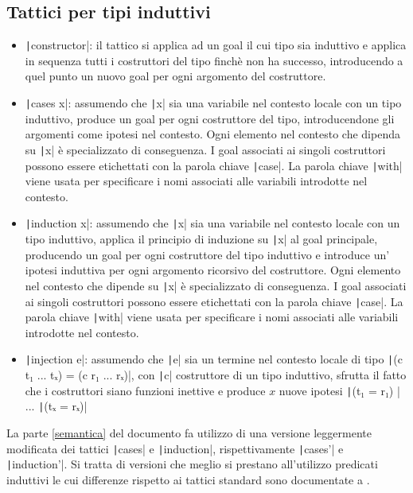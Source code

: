 \begin{itemize}
\end{itemize}

\subsection{Tattici per tipi induttivi}
\begin{itemize}
    \item \texttt|constructor|: il tattico si applica ad un goal il cui tipo sia induttivo e applica in sequenza tutti i costruttori del tipo finchè non ha successo, introducendo a quel punto un nuovo goal per ogni argomento del costruttore.
    \item \texttt|cases x|: assumendo che \texttt|x| sia una variabile nel contesto locale con un tipo induttivo, produce un goal per ogni costruttore del tipo, introducendone gli argomenti come ipotesi nel contesto. Ogni elemento nel contesto che dipenda su \texttt|x| è specializzato di conseguenza. I goal associati ai singoli costruttori possono essere etichettati con la parola chiave \texttt|case|. La parola chiave \texttt|with| viene usata per specificare i nomi associati alle variabili introdotte nel contesto.
    \item \texttt|induction x|: assumendo che \texttt|x| sia una variabile nel contesto locale con un tipo induttivo, applica il principio di induzione su \texttt|x| al goal principale, producendo un goal per ogni costruttore del tipo induttivo e introduce un' ipotesi induttiva per ogni argomento ricorsivo del costruttore. Ogni elemento nel contesto che dipende su \texttt|x| è specializzato di conseguenza. I goal associati ai singoli costruttori possono essere etichettati con la parola chiave \texttt|case|. La parola chiave \texttt|with| viene usata per specificare i nomi associati alle variabili introdotte nel contesto.
    \item \texttt|injection e|: assumendo che \texttt|e| sia un termine nel contesto locale di tipo \texttt|(c t₁ ... tₓ) = (c r₁ ... rₓ)|, con \texttt|c| costruttore di un tipo induttivo, sfrutta il fatto che i costruttori siano funzioni inettive e produce $x$ nuove ipotesi \texttt|(t₁ = r₁) | ... \texttt|(tₓ = rₓ)|
\end{itemize}
La parte \ref{semantica} del documento fa utilizzo di una versione leggermente modificata dei tattici \texttt|cases| e \texttt|induction|, rispettivamente \texttt|cases'| e \texttt|induction'|. Si tratta di versioni che meglio si prestano all'utilizzo predicati induttivi le cui differenze rispetto ai tattici standard sono documentate a \cite{matht}.

